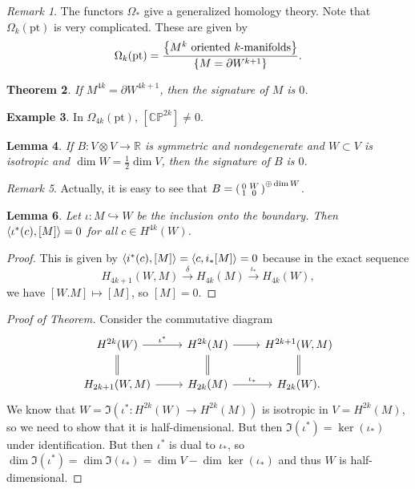 \documentclass[leqno, openany]{memoir}
\newtheorem{thm}{Theorem}[section]
\newtheorem{lem}[thm]{Lemma}
\theoremstyle{definition}
\newtheorem{exm}[thm]{Example}
\theoremstyle{remark}
\newtheorem{rmk}[thm]{Remark}
\theoremstyle{plain}
\theoremstyle{definition}
\theoremstyle{remark}
\newcommand{\R}{\mathbb{R}}
\newcommand{\C}{\mathbb{C}}
\renewcommand{\P}{\mathbb{P}}
\newcommand{\mr}[1]{\mathrm{#1}}
\begin{document}
\begin{rmk} The functors $\Omega_*$ give a generalized homology theory. Note
    that $\Omega_k(\mr{pt})$ is very complicated. These are given by \[
    \Omega_k(\mr{pt}) = \frac{\qty{M^k \text{ oriented $k$-manifolds}}}{\qty{M
= \partial W^{k+1}}}. \] \end{rmk}

\begin{thm} If $M^{4k} = \partial W^{4k+1}$, then the signature of $M$ is $0$.
\end{thm}

\begin{exm} In $\Omega_{4k}(\mr{pt})$, $[\C\P^{2k}] \neq 0$.  \end{exm}

\begin{lem} If $B \colon V \otimes V \to \R$ is symmetric and nondegenerate and
$W \subset V$ is isotropic and $\dim W = \frac{1}{2} \dim V$, then the
signature of $B$ is $0$.  \end{lem}

\begin{rmk} Actually, it is easy to see that $B = \begin{psmallmatrix} 0 & W \\
1 & 0 \end{psmallmatrix}^{\oplus \dim W}$.  \end{rmk}

\begin{lem} Let $\iota \colon M \hookrightarrow W$ be the inclusion onto the
boundary. Then $\ev{\iota^*(c), [M]} = 0$ for all $c \in H^{4k}(W)$.  \end{lem}

\begin{proof} This is given by $\ev{i^*(c), [M]} = \ev{c, i_* [M]} = 0$ because
    in the exact sequence \[ H_{4k+1}(W, M) \xrightarrow{\delta} H_{4k}(M)
    \xrightarrow{\iota_*} H_{4k}(W),\] we have $[W.M] \mapsto [M]$, so $[M] =
0$.  \end{proof}

\begin{proof}[Proof of Theorem] Consider the commutative diagram
    \begin{equation*} \begin{tikzcd} H^{2k}(W) \ar{r}{\iota^*} \ar[equal]{d} &
        H^{2k}(M) \ar[equal]{d} \ar{r} & H^{2k+1}(W, M) \ar[equal]{d} \\
        H_{2k+1}(W, M) \ar{r} & H_{2k}(M) \ar{r}{\iota_*} & H_{2k}(W).
    \end{tikzcd} \end{equation*} We know that $W = \Im(\iota^* \colon H^{2k}(W)
    \to H^{2k}(M))$ is isotropic in $V = H^{2k}(M)$, so we need to show that it
    is half-dimensional. But then $\Im(\iota^*) = \ker (\iota_*)$ under
    identification. But then $\iota^*$ is dual to $\iota_*$, so $\dim
    \Im(\iota^*) = \dim \Im(\iota_*) = \dim V - \dim \ker (\iota_*)$ and thus
    $W$ is half-dimensional.  \end{proof}
\end{document}
